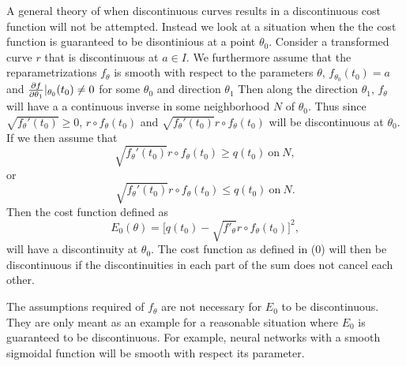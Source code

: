 A general theory of when discontinuous curves results in a discontinuous cost function will not be attempted. Instead we look at a situation when the the cost function is guaranteed to be disontinious at a point \(\theta_0\). Consider a transformed curve  \(r\) that is discontinuous at  \(a \in I\). We furthermore assume that the reparametrizations  \(f_{\theta}\) is smooth with respect to the parameters  \(\theta\),  \(f_{\theta_0}(t_0)=a\) and   \(\pdv{f}{\theta_1}|_{\theta_0}(t_0)\neq 0\) for some  \(\theta_0\) and direction  \(\theta_1\) Then along the direction  \(\theta_1\),  \(f_{\theta}\) will have a a continuous inverse in some neighborhood  \(N\) of  \(\theta_0\). Thus  since \(\sqrt{f_{\theta}'(t_0)} \geq 0\), \(r \circ f_\theta(t_0)\) and  \(\sqrt{f_{\theta}'(t_0)} r \circ f_\theta(t_0)\) will be discontinuous at \(\theta_0\). If we then assume that
\begin{equation}
  \sqrt{f_{\theta}'(t_0)} r \circ f_\theta(t_0) \geq  q(t_0)\ \text{on} \ N,
\end{equation}
or
\begin{equation}
  \sqrt{f_{\theta}'(t_0)} r \circ f_\theta(t_0) \leq q(t_0) \ \text{on} \ N.
\end{equation}
Then the cost function defined as
\begin{equation}
  E_0(\theta) = \big[q(t_0) - \sqrt{f'_{\theta}} r \circ f_{\theta}(t_0)\big]^2,
\end{equation}
will have a discontinuity at  \(\theta_0\). The cost function as defined in (0) will then be discontinuous if the discontinuities in each part of the sum does not cancel each other.

The assumptions required of  \(f_{\theta}\) are not necessary for  \(E_0\) to be discontinuous. They are only meant as an example for a reasonable situation where  \(E_0\) is guaranteed to be discontinuous. For example, neural networks with a smooth sigmoidal function will be smooth with respect its parameter.

